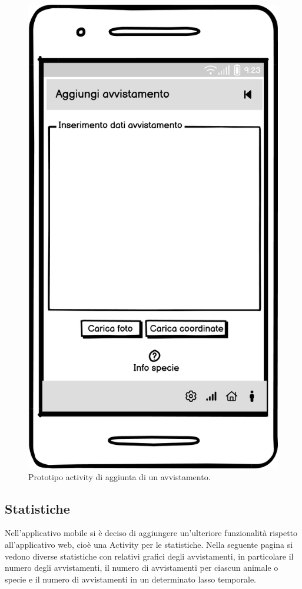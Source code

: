 \documentclass[a4paper,final,12pt]{report}
\begin{document}
\begin{figure}[hbtp]
\centering
\includegraphics[scale=0.50]{img_concettuale/Agg_avv_mob.png}
\caption{Prototipo activity di aggiunta di un avvistamento.}
\end{figure}

\subsection{Statistiche}
Nell'applicativo mobile si è deciso di aggiungere un'ulteriore funzionalità rispetto all'applicativo web, cioè una Activity per le statistiche. Nella seguente pagina si vedono diverse statistiche con relativi grafici degli avvistamenti, in particolare il numero degli avvistamenti, il numero di avvistamenti per ciascun animale o specie e il numero di avvistamenti in un determinato lasso temporale.
\end{document}
